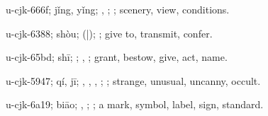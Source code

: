 \begin{multicols}{2}
{\cjkgGlue{}u-cjk-666f; jǐng, yǐng; \cjkgGlue{}, \cjkgGlue{}; \cjkgGlue{}; scenery, view, conditions.

\cjkgGlue{}u-cjk-6388; shòu; \cjkgGlue{}\cjkgGlue{}(\cjkgGlue{}|\cjkgGlue{}); \cjkgGlue{}; give to, transmit, confer.

\cjkgGlue{}u-cjk-65bd; shī; \cjkgGlue{}\cjkgGlue{}\cjkgGlue{}; \cjkgGlue{}, \cjkgGlue{}; grant, bestow, give, act, name.

\cjkgGlue{}u-cjk-5947; qí, jī; \cjkgGlue{}\cjkgGlue{}\cjkgGlue{}, \cjkgGlue{}\cjkgGlue{}\cjkgGlue{}, \cjkgGlue{}, \cjkgGlue{}\cjkgGlue{}\cjkgGlue{}; \cjkgGlue{}; strange, unusual, uncanny, occult.

\cjkgGlue{}u-cjk-6a19; biāo; \cjkgGlue{}, \cjkgGlue{}; \cjkgGlue{}; a mark, symbol, label, sign, standard.

}
\end{multicols}
